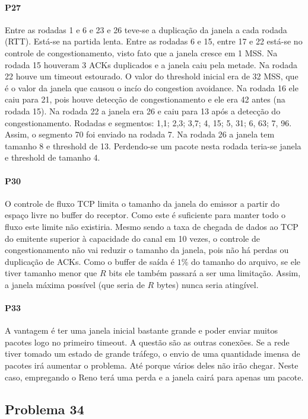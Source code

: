 \paragraph{P27} Entre as rodadas 1 e 6 e 23 e 26 teve-se a duplicação da janela a cada rodada (RTT). Está-se na partida lenta.
Entre as rodadas 6 e 15, entre 17 e 22 está-se no controle de congestionamento, visto fato que a janela cresce em 1 MSS.
Na rodada 15 houveram 3 ACKs duplicados e a janela caiu pela metade.
Na rodada 22 houve um timeout estourado.
O valor do threshold inicial era de 32 MSS, que é o valor da janela que causou o incío do congestion avoidance. 
Na rodada 16 ele caiu para 21, pois houve detecção de congestionamento e ele era 42 antes (na rodada 15).
Na rodada 22 a janela era 26 e caiu para 13 após a detecção do congestionamento.
Rodadas e segmentos: 1,1; 2,3; 3,7; 4, 15; 5, 31; 6, 63; 7, 96. Assim, o segmento 70 foi enviado na rodada 7.
Na rodada 26 a janela tem tamanho 8 e threshold de 13. Perdendo-se um pacote nesta rodada teria-se janela e threshold de tamanho 4.

\paragraph{P30} O controle de fluxo TCP limita o tamanho da janela do emissor a partir do espaço livre no buffer do receptor. Como este é suficiente para manter todo o fluxo este limite não existiria.
Mesmo sendo a taxa de chegada de dados ao TCP do emitente superior à capacidade do canal em 10 vezes, o controle de congestionamento não vai reduzir o tamanho da janela, pois não há perdas ou duplicação de ACKs.
Como o buffer de saída é $1\%$ do tamanho do arquivo, se ele tiver tamanho menor que $R$ bits ele também passará a ser uma limitação.
Assim, a janela máxima possível (que seria de $R$ bytes) nunca seria atingível.

\paragraph{P33} A vantagem é ter uma janela inicial bastante grande e poder enviar muitos pacotes logo no primeiro timeout. A questão são as outras conexões. Se a rede tiver tomado um estado de grande tráfego, o envio de uma quantidade imensa de pacotes irá aumentar o problema. Até porque vários deles não irão chegar. Neste caso, empregando o Reno terá uma perda e a janela cairá para apenas um pacote.

\subsection{Problema 34}

